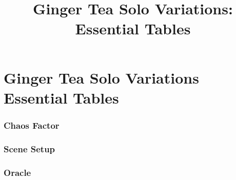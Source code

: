 

\title{Ginger Tea Solo Variations: Essential Tables}


\mainmatter
\chapter*{Ginger Tea Solo Variations\hspace*{8cm} Essential Tables \version}
\subsection{Chaos Factor}

\subsection{Scene Setup}


\newpage
\subsection{Oracle}


